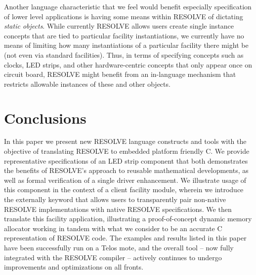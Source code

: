 Another language characteristic that we feel would benefit especially specification of lower level applications is having some means within RESOLVE of dictating \textit{static objects}. While currently RESOLVE allows users create single instance concepts that are tied to particular facility instantiations, we currently have no means of limiting how many instantiations of a particular facility there might be (not even via standard facilities). Thus, in terms of specifying concepts such as clocks, LED strips, and other hardware-centric concepts that only appear once on circuit board, RESOLVE might benefit from an in-language mechanism that restricts allowable instances of these and other objects. 

\section{Conclusions}

In this paper we present new RESOLVE language constructs and tools with the objective of translating RESOLVE to embedded platform friendly C. We provide representative specifications of an LED strip component that both demonstrates the benefits of RESOLVE's approach to reusable mathematical developments, as well as formal verification of a single driver enhancement. We illustrate usage of this component in the context of a client facility module, wherein we introduce the externally keyword that allows users to transparently pair non-native RESOLVE implementations with native RESOLVE specifications. We then translate this facility application, illustrating a proof-of-concept dynamic memory allocator working in tandem with what we consider to be an accurate C representation of RESOLVE code. The examples and results listed in this paper have been successfully run on a Telos mote, and the overall tool -- now fully integrated with the RESOLVE compiler -- actively continues to undergo improvements and optimizations on all fronts.
